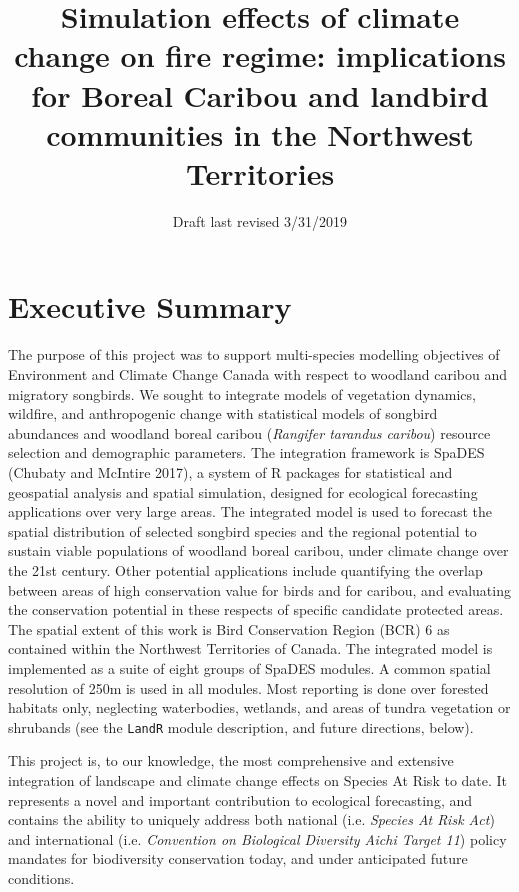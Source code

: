 \documentclass[]{article}
\title{Simulation effects of climate change on fire regime: implications for
Boreal Caribou and landbird communities in the Northwest Territories}
\author{}
\date{Draft last revised 3/31/2019}
\begin{document}
\maketitle

{
\setcounter{tocdepth}{3}
\tableofcontents
}
\section{Executive Summary}\label{executive-summary}

The purpose of this project was to support multi-species modelling
objectives of Environment and Climate Change Canada with respect to
woodland caribou and migratory songbirds. We sought to integrate models
of vegetation dynamics, wildfire, and anthropogenic change with
statistical models of songbird abundances and woodland boreal caribou
(\emph{Rangifer tarandus caribou}) resource selection and demographic
parameters. The integration framework is SpaDES (Chubaty and McIntire
2017), a system of R packages for statistical and geospatial analysis
and spatial simulation, designed for ecological forecasting applications
over very large areas. The integrated model is used to forecast the
spatial distribution of selected songbird species and the regional
potential to sustain viable populations of woodland boreal caribou,
under climate change over the 21st century. Other potential applications
include quantifying the overlap between areas of high conservation value
for birds and for caribou, and evaluating the conservation potential in
these respects of specific candidate protected areas. The spatial extent
of this work is Bird Conservation Region (BCR) 6 as contained within the
Northwest Territories of Canada. The integrated model is implemented as
a suite of eight groups of SpaDES modules. A common spatial resolution
of 250m is used in all modules. Most reporting is done over forested
habitats only, neglecting waterbodies, wetlands, and areas of tundra
vegetation or shrubands (see the \texttt{LandR} module description, and
future directions, below).

This project is, to our knowledge, the most comprehensive and extensive
integration of landscape and climate change effects on Species At Risk
to date. It represents a novel and important contribution to ecological
forecasting, and contains the ability to uniquely address both national
(i.e. \emph{Species At Risk Act}) and international (i.e.
\emph{Convention on Biological Diversity Aichi Target 11}) policy
mandates for biodiversity conservation today, and under anticipated
future conditions.
\end{document}
